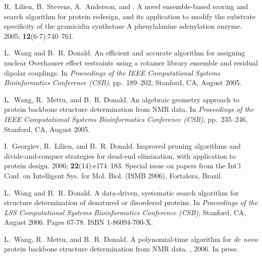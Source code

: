 \documentclass[11pt]{nih}
\begin{document}
\begin{Enumerate}
R.~Lilien, B.~Stevens, A.~Anderson, and {\brd}.
\newblock A novel ensemble-based scoring and search algorithm for protein
  redesign, and its application to modify the substrate specificity of the
  gramicidin synthetase {A} phenylalanine adenylation enzyme.
 2005; {\bf{12}}(6-7):740--761.

L.~Wang and B.~R. Donald.
\newblock An efficient and accurate algorithm for assigning nuclear
  {Overhauser} effect restraints using a rotamer library ensemble and residual
  dipolar couplings.
\newblock In {\em Proceedings of the {IEEE} Computational Systems
  Bioinformatics Conference ({CSB})}, pp.~189--202,
Stanford, CA, August 2005.

L.~Wang, R.~Mettu, and B.~R. Donald.
\newblock An algebraic geometry approach to protein backbone structure
  determination from {NMR} data.
\newblock In {\em Proceedings of the {IEEE} Computational Systems
  Bioinformatics Conference ({CSB})}, pp.~235--246, Stanford, CA,
August 2005.


I.~Georgiev, R.~Lilien, and B.~R. Donald.
\newblock Improved pruning algorithms and divide-and-conquer strategies for
  dead-end elimination, with application to protein design.
 2006; {\bf{22}}(14):e174--183.
\newblock Special issue on papers from the Int'l Conf. on Intelligent
  Sys. for Mol. Biol. ({ISMB 2006}), Fortaleza, Brazil.

L.~Wang and B.~R. Donald.
\newblock A data-driven, systematic search algorithm for structure
  determination of denatured or disordered proteins.
\newblock In {\em Proceedings of the LSS Computational Systems Bioinformatics
  Conference ({CSB})}, Stanford, CA, August 2006.
 Pages 67-78. ISBN 1-86094-700-X.

L.~Wang, R.~Mettu, and B.~R. Donald.
\newblock A polynomial-time algorithm for {\em de novo} protein backbone
  structure determination from {NMR} data.
, 2006.
\newblock In press.


\end{Enumerate}
\end{document}
